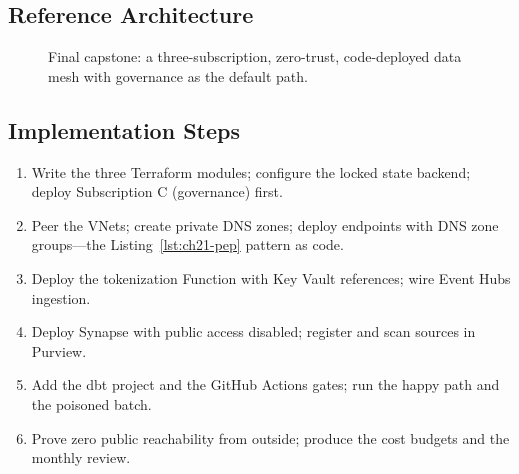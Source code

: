 \subsection*{Reference Architecture}
\begin{figure}[H]
    \centering
    \caption{Final capstone: a three-subscription, zero-trust, code-deployed data mesh with governance as the default path.}
    \label{fig:ch24-capstone-arch}
\end{figure}

\subsection*{Implementation Steps}
\begin{enumerate}
    \item Write the three Terraform modules; configure the locked state backend; deploy Subscription C (governance) first.
    \item Peer the VNets; create private DNS zones; deploy endpoints with DNS zone groups---the Listing~\ref{lst:ch21-pep} pattern as code.
    \item Deploy the tokenization Function with Key Vault references; wire Event Hubs ingestion.
    \item Deploy Synapse with public access disabled; register and scan sources in Purview.
    \item Add the dbt project and the GitHub Actions gates; run the happy path and the poisoned batch.
    \item Prove zero public reachability from outside; produce the cost budgets and the monthly review.
\end{enumerate}

